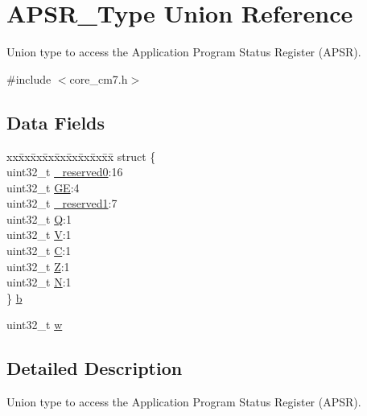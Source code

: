 \hypertarget{unionAPSR__Type}{}\section{A\+P\+S\+R\+\_\+\+Type Union Reference}
\label{unionAPSR__Type}


Union type to access the Application Program Status Register (A\+P\+SR).  




{\ttfamily \#include $<$core\+\_\+cm7.\+h$>$}

\subsection*{Data Fields}
\begin{DoxyCompactItemize}
\item 
\begin{tabbing}
xx\=xx\=xx\=xx\=xx\=xx\=xx\=xx\=xx\=\kill
struct \{\\
\>uint32\_t \mbox{\hyperlink{unionAPSR__Type_afbce95646fd514c10aa85ec0a33db728}{\_reserved0}}:16\\
\>uint32\_t \mbox{\hyperlink{unionAPSR__Type_adcb98a5b9c93b0cb69cdb7af5638f32e}{GE}}:4\\
\>uint32\_t \mbox{\hyperlink{unionAPSR__Type_ac681f266e20b3b3591b961e13633ae13}{\_reserved1}}:7\\
\>uint32\_t \mbox{\hyperlink{unionAPSR__Type_a22d10913489d24ab08bd83457daa88de}{Q}}:1\\
\>uint32\_t \mbox{\hyperlink{unionAPSR__Type_a8004d224aacb78ca37774c35f9156e7e}{V}}:1\\
\>uint32\_t \mbox{\hyperlink{unionAPSR__Type_a86e2c5b891ecef1ab55b1edac0da79a6}{C}}:1\\
\>uint32\_t \mbox{\hyperlink{unionAPSR__Type_a3b04d58738b66a28ff13f23d8b0ba7e5}{Z}}:1\\
\>uint32\_t \mbox{\hyperlink{unionAPSR__Type_a7e7bbba9b00b0bb3283dc07f1abe37e0}{N}}:1\\
\} \mbox{\hyperlink{unionAPSR__Type_ac5743179302d4d93d913f963b9c1d26b}{b}}\\

\end{tabbing}\item 
uint32\+\_\+t \mbox{\hyperlink{unionAPSR__Type_ae4c2ef8c9430d7b7bef5cbfbbaed3a94}{w}}
\end{DoxyCompactItemize}


\subsection{Detailed Description}
Union type to access the Application Program Status Register (A\+P\+SR). 

